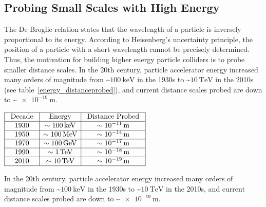 \subsection{Probing Small Scales with High Energy}
The De Broglie relation states that the wavelength of a particle is inversely proportional to its energy.
According to Heisenberg's uncertainty principle, the position of a particle with a short wavelength cannot be precisely determined.
Thus, the motivation for building higher energy particle colliders is to probe smaller distance scales.
In the 20th century, particle accelerator energy increased many orders of magnitude from \sim$\SI{100}{\keV}$ in the 1930s to \sim$\SI{10}{\TeV}$ in the 2010s (see table~\ref{energy_distanceprobed}), and current distance scales probed are down to \sim$\SI{e-19}{\m}$.
\begin{table}[htb]
\begin{center}
\begin{math}
\begin{array}{|c|c|c|}
\hline \text { Decade } & \text { Energy } & \text { Distance Probed } \\
\hline 1930 & \sim \SI{100}{\keV} & \sim \SI{e-11}{\m} \\
\hline 1950 & \sim \SI{100}{\MeV} & \sim \SI{e-14}{\m} \\
\hline 1970 & \sim \SI{100}{\GeV} & \sim \SI{e-17}{\m} \\
\hline 1990 & \sim \SI{1}{\TeV} & \sim \SI{e-18}{\m} \\
\hline 2010 & \sim \SI{10}{\TeV} & \sim \SI{e-19}{\m} \\
\hline
\end{array}
\end{math}
\caption{In the 20th century, particle accelerator energy increased many orders of magnitude from \sim$\SI{100}{\keV}$ in the 1930s to \sim$\SI{10}{\TeV}$ in the 2010s, and current distance scales probed are down to \sim$\SI{e-19}{\m}$.
        }
\label{energy_distanceprobed}
\end{center}
\end{table}

